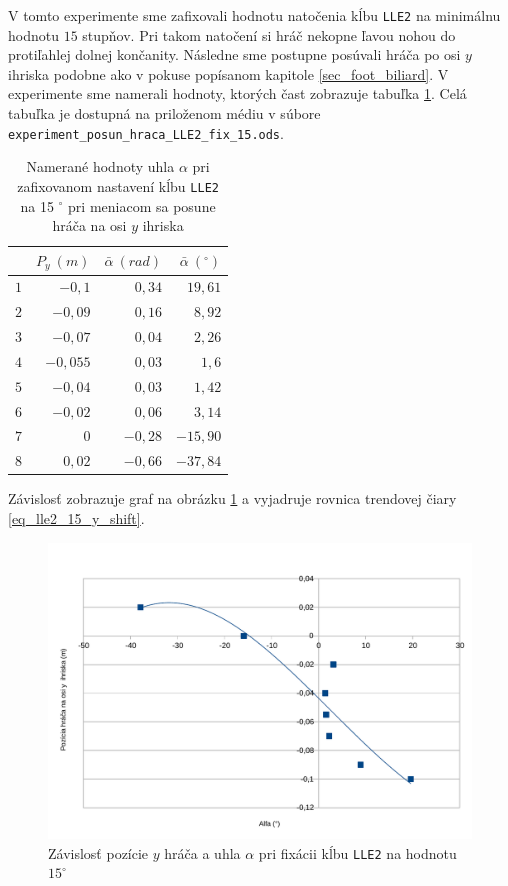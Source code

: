 V tomto experimente sme zafixovali hodnotu natočenia kĺbu \texttt{LLE2} na minimálnu hodnotu $15$ stupňov. Pri takom natočení si hráč nekopne ľavou nohou do protiľahlej dolnej končanity. Následne sme postupne posúvali hráča po osi $y$ ihriska podobne ako v pokuse popísanom kapitole \ref{sec_foot_biliard}. V experimente sme namerali hodnoty, ktorých čast zobrazuje tabuľka \ref{tab_lle2_15_y_shift}. Celá tabuľka je dostupná na priloženom médiu v súbore \texttt{experiment\_posun\_hraca\_LLE2\_fix\_15.ods}.
\begin{table}[H]
\centering
  \begin{tabular}{|r|r|r|r|}
  \hline
	 & $P_{y}~(m)$ & $\bar{\alpha}~(rad)$ & $\bar{\alpha}~(^{\circ})$ \\
 \hline 
 $1$ & $-0,1$ & $0,34$ & $19,61$ \\
 \hline 
 $2$ & $-0,09$ & $0,16$ & $8,92$ \\
 \hline
 $3$ & $-0,07$ & $0,04$ & $2,26$ \\
 \hline 
 $4$ & $-0,055$ & $0,03$ & $1,6$ \\
 \hline
 $5$ & $-0,04$ & $0,03$ & $1,42$ \\
 \hline 
 $6$ & $-0,02$ & $0,06$ & $3,14$ \\
 \hline 
 $7$ & $0$ & $-0,28$ & $-15,90$ \\
 \hline
 $8$ & $0,02$ & $-0,66$ & $-37,84$ \\
  \hline
  \end{tabular}
  \caption{Namerané hodnoty uhla $\alpha$ pri zafixovanom nastavení kĺbu \texttt{LLE2} na 15 $^{\circ}$ pri meniacom sa posune hráča na osi $y$ ihriska}
  \label{tab_lle2_15_y_shift}
\end{table}

Závislosť zobrazuje graf na obrázku \ref{pic_lle2_15_y_shift} a vyjadruje rovnica trendovej čiary \ref{eq_lle2_15_y_shift}.

\begin{figure}[H]
	\centering
	\includegraphics[scale=0.7]{./data/fixed_LLE2_15_dependency_to_shift_left}
	\caption{Závislosť pozície $y$ hráča a uhla $\alpha$ pri fixácii kĺbu \texttt{LLE2} na hodnotu $15^{\circ}$}
	\label{pic_lle2_15_y_shift}
\end{figure}

